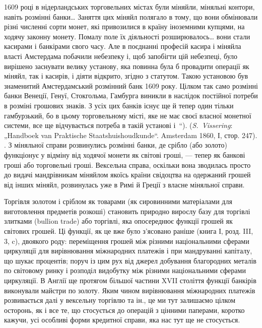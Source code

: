 {1609 році в нідерландських торговельних містах були міняйли, міняльні контори,
навіть розмінні банки\dots{} Заняття цих міняйл полягало в тому, що вони
обмінювали різні численні сорти монет, які привозилися в країну іноземними
купцями, на ходячу законну монету. Помалу поле їх діяльності розширювалось\dots{} вони стали касирами і банкірами свого часу. Але в поєднанні професій
касира і міняйла власті Амстердама побачили небезпеку і, щоб запобігти цій
небезпеці, було вирішено заснувати велику установу, яка повинна була б провадити
операції як міняйл, так і касирів, і діяти відкрито, згідно з статутом.
Такою установою був знаменитий Амстердамський розмінний банк 1609 року.
Цілком так само розмінні банки Венеції, Генуї, Стокгольма, Гамбурга виникли
в наслідок постійної потреби в розміні грошових знаків. З усіх цих банків
існує ще й тепер один тільки гамбурзький, бо в цьому торговельному місті, яке
не має своєї власної монетної системи, все ще відчувається потреба в такій
установі і~“). (\emph{S.~Vissering}: „Handboek van Praktische Staatshuishoudkunde“.
Amsterdam 1860, І, стор. 247).
}. З міняльної справи розвинулись розмінні банки, де
срібло (або золото) функціонує у відміну від ходячої монети
як світові гроші, — тепер як банкові гроші або торговельні гроші.
Вексельна справа, оскільки вона зводилась просто до видачі мандрівникам
міняйлом якоїсь країни свідоцтва на одержаний грошей
від інших міняйл, розвинулась уже в Римі й Греції з власне
міняльної справи.

Торгівля золотом і сріблом як товарами (як сировинними
матеріалами для виготовлення предметів розкоші) становить
природно вирослу базу для торгівлі злитками (bullion trade) або
торгівлі, яка опосереднює функції грошей як світових грошей.
Ці функції, як це вже було з’ясовано раніше (книга І, розд. III,
3, c), двоякого роду: переміщення грошей між різними національними
сферами циркуляції для вирівнювання міжнародних
платежів і при мандруванні капіталу, що шукає процентів;
поруч із цим рух від джерел добування благородних металів
по світовому ринку і розподіл видобутку між різними національними
сферами циркуляції. В Англії ще протягом більшої
частини XVII століття функції банкірів виконували майстри
по золоту. Яким чином вирівнювання міжнародних платежів
розвивається далі у вексельну торгівлю та ін., це ми тут залишаємо
цілком осторонь, як і все те, що стосується до операцій
з цінними паперами, коротко кажучи, усі особливі форми
кредитної справи, яка нас тут ще не стосується.

